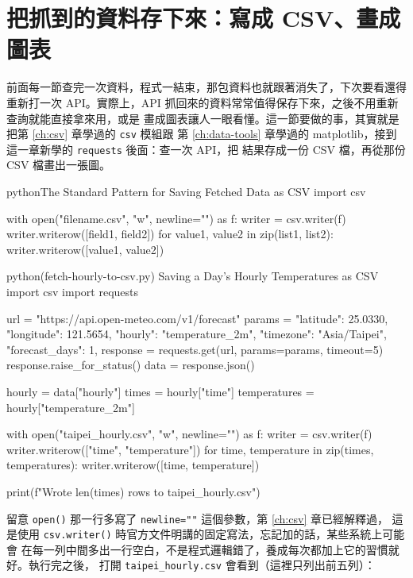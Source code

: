 \section{把抓到的資料存下來：寫成 CSV、畫成圖表}
\label{sec:save-and-chart}

前面每一節查完一次資料，程式一結束，那包資料也就跟著消失了，下次要看還得重新打一次
API。實際上，API 抓回來的資料常常值得保存下來，之後不用重新查詢就能直接拿來用，或是
畫成圖表讓人一眼看懂。這一節要做的事，其實就是把第 \ref{ch:csv} 章學過的 \texttt{csv} 模組跟
第 \ref{ch:data-tools} 章學過的 matplotlib，接到這一章新學的 \texttt{requests} 後面：查一次 API，把
結果存成一份 CSV 檔，再從那份 CSV 檔畫出一張圖。

\begin{code}{python}{The Standard Pattern for Saving Fetched Data as CSV}
import csv

with open("filename.csv", "w", newline="") as f:
    writer = csv.writer(f)
    writer.writerow([field1, field2])
    for value1, value2 in zip(list1, list2):
        writer.writerow([value1, value2])
\end{code}

\begin{example}{python}{(fetch-hourly-to-csv.py) Saving a Day's Hourly Temperatures as CSV}
import csv
import requests

url = "https://api.open-meteo.com/v1/forecast"
params = {
    "latitude": 25.0330,
    "longitude": 121.5654,
    "hourly": "temperature_2m",
    "timezone": "Asia/Taipei",
    "forecast_days": 1,
}
response = requests.get(url, params=params, timeout=5)
response.raise_for_status()
data = response.json()

hourly = data["hourly"]
times = hourly["time"]
temperatures = hourly["temperature_2m"]

with open("taipei_hourly.csv", "w", newline="") as f:
    writer = csv.writer(f)
    writer.writerow(["time", "temperature"])
    for time, temperature in zip(times, temperatures):
        writer.writerow([time, temperature])

print(f"Wrote {len(times)} rows to taipei_hourly.csv")
\end{example}


留意 \texttt{open()} 那一行多寫了 \texttt{newline=""} 這個參數，第 \ref{ch:csv} 章已經解釋過，
這是使用 \texttt{csv.writer()} 時官方文件明講的固定寫法，忘記加的話，某些系統上可能會
在每一列中間多出一行空白，不是程式邏輯錯了，養成每次都加上它的習慣就好。執行完之後，
打開 \texttt{taipei\_hourly.csv} 會看到（這裡只列出前五列）：

